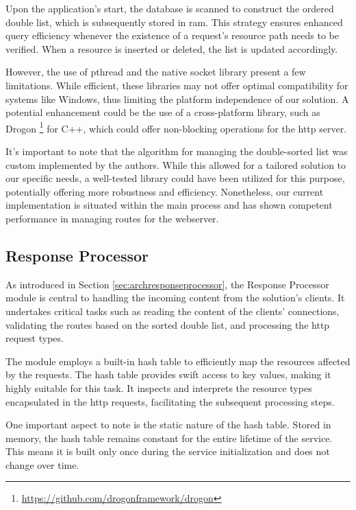 \documentclass[a4paper,fleqn]{cas-dc}
\begin{document}
Upon the application's start, the database is scanned to construct the ordered double list, which is subsequently stored in \gls{ram}. This strategy ensures enhanced query efficiency whenever the existence of a request's resource path needs to be verified. When a resource is inserted or deleted, the list is updated accordingly.

However, the use of pthread and the native socket library present a few limitations. While efficient, these libraries may not offer optimal compatibility for systems like Windows, thus limiting the platform independence of our solution. A potential enhancement could be the use of a cross-platform library, such as Drogon \footnote{\url{https://github.com/drogonframework/drogon}} for C++, which could offer non-blocking operations for the \gls{http} server.

It's important to note that the algorithm for managing the double-sorted list was custom implemented by the authors. While this allowed for a tailored solution to our specific needs, a well-tested library could have been utilized for this purpose, potentially offering more robustness and efficiency. Nonetheless, our current implementation is situated within the main process and has shown competent performance in managing routes for the webserver.

\subsection{Response Processor}

As introduced in Section \ref{sec:archresponseprocessor}, the Response Processor module is central to handling the incoming content from the solution's clients. It undertakes critical tasks such as reading the content of the clients' connections, validating the routes based on the sorted double list, and processing the \gls{http} request types.

The module employs a built-in hash table to efficiently map the resources affected by the requests. The hash table provides swift access to key values, making it highly suitable for this task. It inspects and interprets the resource types encapsulated in the \gls{http} requests, facilitating the subsequent processing steps.

One important aspect to note is the static nature of the hash table. Stored in memory, the hash table remains constant for the entire lifetime of the service. This means it is built only once during the service initialization and does not change over time.
\end{document}
